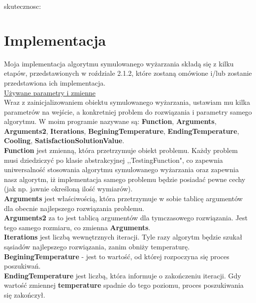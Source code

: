 \documentclass[twoside]{projektInzynierskiMS1}
\newcommand{\si}{ś}
\begin{document}
skutecznosc:\\

\section{Implementacja}

Moja implementacja algorytmu symulowanego wyżarzania składą się z kilku etapów, przedstawionych w roździale 2.1.2, które zostaną omówione i/lub zostanie przedstawiona ich implementacja. \\


\underline{Używane parametry i zmienne} \\
Wraz z zainicjalizowaniem obiektu symulowanego wyżarzania, ustawiam mu kilka parametrów na wej\si cie, a konkretniej problem do rozwiązania i parametry samego algorytmu. W moim programie nazywane są: \textbf{Function}, \textbf{Arguments}, \textbf{Arguments2}, \textbf{Iterations}, \textbf{BeginingTemperature}, \textbf{EndingTemperature}, \textbf{Cooling}, \textbf{SatisfactionSolutionValue}. \\

\textbf{Function} jest zmienną, która przetrzymuje obiekt problemu. Każdy problem musi dziedziczyć po klasie abstrakcyjnej ,,TestingFunction", co zapewnia uniwersalno\si ć stosowania algorytmu symulowanego wyżarzania oraz zapewnia nasz algorytm, iż implementacja samego problemu będzie posiadać pewne cechy (jak np. jawnie okre\si loną ilo\si ć wymiarów). \\

\textbf{Arguments} jest wła\si ciwo\si cią, która przetrzymuje w sobie tablicę argumentów dla obecnie najlepszego rozwiązania problemu. \\

\textbf{Arguments2} za to jest tablicą argumentów dla tymczasowego rozwiązania. Jest tego samego rozmiaru, co zmienna \textbf{Arguments}. \\

\textbf{Iterations} jest liczbą wewnętrznych iteracji. Tyle razy algorytm będzie szukał sąsiadów najlepszego rozwiązania, zanim obniży temperaturę. \\

\textbf{BeginingTemperature} - jest to warto\si ć, od której rozpoczyna się proces poszukiwań.\\ 

\textbf{EndingTemperature} jest liczbą, która informuje o zakończeniu iteracji. Gdy warto\si ć zmiennej \textbf{temperature} spadnie do tego poziomu, proces poszukiwania się zakończył. \\
\end{document}
